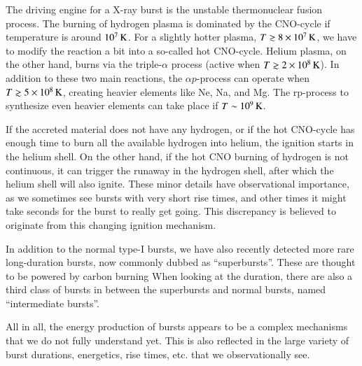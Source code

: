 The driving engine for a X-ray burst is the unstable thermonuclear fusion process.\cite{Fujimoto81, Wallace81, Fisker08}
The burning of hydrogen plasma is dominated by the CNO-cycle if temperature is around $10^7 \, \mathrm{K}$.
For a slightly hotter plasma, $T \gtrsim 8 \times 10^{7} \, \mathrm{K}$, we have to modify the reaction a bit into a so-called hot CNO-cycle.\cite{FH65}
Helium plasma, on the other hand, burns via the triple-$\alpha$ process (active when $T \gtrsim 2 \times 10^{8} \, \mathrm{K}$).
In addition to these two main reactions, the $\alpha p$-process can operate when $T \gtrsim 5 \times 10^{8} \, \mathrm{K}$, creating heavier elements like Ne, Na, and Mg.
The rp-process to synthesize even heavier elements can take place if $T \sim 10^9 \, \mathrm{K}$.

If the accreted material does not have any hydrogen, or if the hot CNO-cycle has enough time to burn all the available hydrogen into helium, the ignition starts in the helium shell.
On the other hand, if the hot CNO burning of hydrogen is not continuous, it can trigger the runaway in the hydrogen shell, after which the helium shell will also ignite.
These minor details have observational importance, as we sometimes see bursts with very short rise times, and other times it might take seconds for the burst to really get going.\cite{SB10}
This discrepancy is believed to originate from this changing ignition mechanism.

In addition to the normal type-I bursts, we have also recently detected more rare long-duration bursts, now commonly dubbed as ``superbursts''. \cite{CHK00, Kuulkers02, SB02}
These are thought to be powered by carbon burning\cite{Cumming01}
When looking at the duration, there are also a third class of bursts in between the superbursts and normal bursts, named ``intermediate bursts''.\cite{Cumming06}

All in all, the energy production of bursts appears to be a complex mechanisms that we do not fully understand yet.
This is also reflected in the large variety of burst durations, energetics, rise times, etc. that we observationally see.\cite{GMH08}



